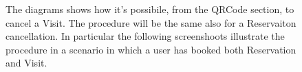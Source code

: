 \begin{figure}[H]
  \label{QRCode_handle2}
   \caption{The diagrams shows how it's possibile, from the QRCode section, to cancel a Visit. The procedure will be the same also for a Reservaiton cancellation. In particular the following screenshoots illustrate the procedure in a scenario in which a user has booked both Reservation and Visit.}
  \centering
   
\end{figure}


